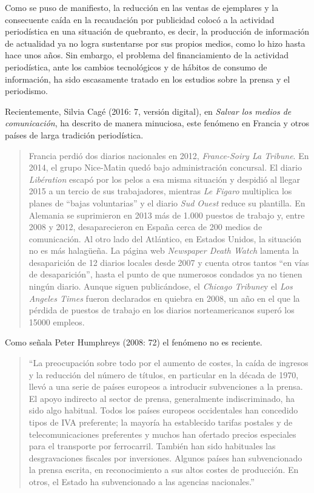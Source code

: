 Como se puso de manifiesto, la reducción en las ventas de ejemplares y la consecuente caída en la recaudación por publicidad colocó a la actividad periodística en una situación de quebranto, es decir, la producción de información de actualidad ya no logra sustentarse por sus propios medios, como lo hizo hasta hace unos años. Sin embargo, el problema del financiamiento de la actividad periodística, ante los cambios tecnológicos y de hábitos de consumo de información, ha sido escasamente tratado en los estudios sobre la prensa y el periodismo.

Recientemente, Silvia Cagé (2016: 7, versión digital), en \emph{Salvar los medios de comunicación}, ha descrito de manera minuciosa, este fenómeno en Francia y otros países de larga tradición periodística.

\begin{quote}
	Francia perdió dos diarios nacionales en 2012, \emph{France-Soiry La Tribune}. En 2014, el grupo Nice-Matin  quedó bajo administración concursal. El diario \emph{Libération} escapó por los pelos a esa misma situación y despidió al llegar 2015 a un tercio de sus trabajadores, mientras \emph{Le Figaro} multiplica los planes de ``bajas voluntarias'' y el diario \emph{Sud Ouest} reduce su plantilla. En Alemania se suprimieron en 2013 más de 1.000 puestos de trabajo y, entre 2008 y 2012, desaparecieron en España cerca de 200 medios de comunicación. Al otro lado del Atlántico, en Estados Unidos, la situación no es más halagüeña. La página web \emph{Newspaper Death Watch} lamenta la desaparición de 12 diarios locales desde 2007 y cuenta otros tantos ``en vías de desaparición'', hasta el punto de que numerosos condados ya no tienen ningún diario. Aunque siguen publicándose, el \emph{Chicago Tribune}y el \emph{Los Angeles Times }fueron declarados en quiebra en 2008, un año en el que la pérdida de puestos de trabajo en los diarios norteamericanos superó los \num{15000} empleos.
\end{quote}


Como señala Peter Humphreys (2008: 72) el fenómeno no es reciente.

\begin{quote}
	\enquote{La preocupación sobre todo por el aumento de costes, la caída de ingresos y la reducción del número de títulos, en particular en la década de 1970, llevó a una serie de países europeos a introducir subvenciones a la prensa. El apoyo indirecto al sector de prensa, generalmente indiscriminado, ha sido algo habitual. Todos los países europeos occidentales han concedido tipos de IVA preferente; la mayoría ha establecido tarifas postales y de telecomunicaciones preferentes y muchos han ofertado precios especiales para el transporte por ferrocarril. También han sido habituales las desgravaciones fiscales por inversiones. Algunos países han subvencionado la prensa escrita, en reconocimiento a sus altos costes de producción. En otros, el Estado ha subvencionado a las agencias nacionales.}
\end{quote}



